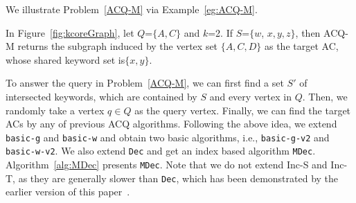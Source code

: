{We illustrate Problem~\ref{ACQ-M} via Example~\ref{eg:ACQ-M}.

\begin{example}
\label{eg:ACQ-M}
In Figure~\ref{fig:kcoreGraph}, let $Q$=$\{A,C\}$ and $k$=2.
If $S$=$\{w$, $x,y,z\}$, then ACQ-M returns the subgraph induced by the vertex set $\{A,C,D\}$ as the target AC, whose shared keyword set is$\{x,y\}$.
\end{example}

To answer the query in Problem~\ref{ACQ-M}, we can first find a set $S'$ of intersected keywords, which are contained by $S$ and every vertex in $Q$. Then, we randomly take a vertex $q$$\in$$Q$ as the query vertex.
Finally, we can find the target ACs by any of previous ACQ algorithms.
Following the above idea, we extend {\tt basic-g} and {\tt basic-w} and obtain two basic algorithms, i.e., {\tt basic-g-v2} and {\tt basic-w-v2}. We also extend {\tt Dec} and get an index based algorithm {\tt MDec}.
Algorithm~\ref{alg:MDec} presents {\tt MDec}.
Note that we do not extend {Inc-S} and {Inc-T}, as they are generally slower than {\tt Dec}, which has been demonstrated by the earlier version of this paper~\cite{fang2016effective}.


} 